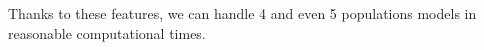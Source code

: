 Thanks to these features, we can handle 4 and even 5 populations models in reasonable computational times.
 






























